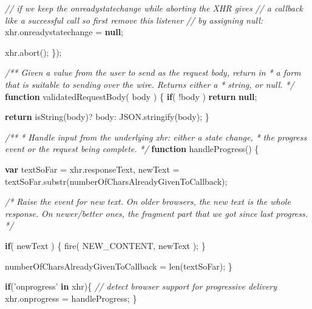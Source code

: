\documentclass[]{article}
\newenvironment{Shaded}{}{}
\newcommand{\KeywordTok}[1]{\textcolor[rgb]{0.00,0.44,0.13}{\textbf{{#1}}}}
\newcommand{\StringTok}[1]{\textcolor[rgb]{0.25,0.44,0.63}{{#1}}}
\newcommand{\CommentTok}[1]{\textcolor[rgb]{0.38,0.63,0.69}{\textit{{#1}}}}
\newcommand{\OtherTok}[1]{\textcolor[rgb]{0.00,0.44,0.13}{{#1}}}
\newcommand{\FunctionTok}[1]{\textcolor[rgb]{0.02,0.16,0.49}{{#1}}}
\newcommand{\NormalTok}[1]{{#1}}
\begin{document}
\begin{Shaded}
\begin{Highlighting}[]
      \CommentTok{// if we keep the onreadystatechange while aborting the XHR gives }
      \CommentTok{// a callback like a successful call so first remove this listener}
      \CommentTok{// by assigning null:}
      \OtherTok{xhr}\NormalTok{.}\FunctionTok{onreadystatechange} \NormalTok{= }\KeywordTok{null}\NormalTok{;}
            
      \OtherTok{xhr}\NormalTok{.}\FunctionTok{abort}\NormalTok{();}
   \NormalTok{\});}

   \CommentTok{/** Given a value from the user to send as the request body, return in}
\CommentTok{    *  a form that is suitable to sending over the wire. Returns either a }
\CommentTok{    *  string, or null.        }
\CommentTok{    */}
   \KeywordTok{function} \FunctionTok{validatedRequestBody}\NormalTok{( body ) \{}
      \KeywordTok{if}\NormalTok{( !body )}
         \KeywordTok{return} \KeywordTok{null}\NormalTok{;}
   
      \KeywordTok{return} \FunctionTok{isString}\NormalTok{(body)? body: }\OtherTok{JSON}\NormalTok{.}\FunctionTok{stringify}\NormalTok{(body);}
   \NormalTok{\}      }

   \CommentTok{/** }
\CommentTok{    * Handle input from the underlying xhr: either a state change,}
\CommentTok{    * the progress event or the request being complete.}
\CommentTok{    */}
   \KeywordTok{function} \FunctionTok{handleProgress}\NormalTok{() \{}
                        
      \KeywordTok{var} \NormalTok{textSoFar = }\OtherTok{xhr}\NormalTok{.}\FunctionTok{responseText}\NormalTok{,}
          \NormalTok{newText = }\OtherTok{textSoFar}\NormalTok{.}\FunctionTok{substr}\NormalTok{(numberOfCharsAlreadyGivenToCallback);}
      
      
      \CommentTok{/* Raise the event for new text.}
\CommentTok{      }
\CommentTok{         On older browsers, the new text is the whole response. }
\CommentTok{         On newer/better ones, the fragment part that we got since }
\CommentTok{         last progress. */}
         
      \KeywordTok{if}\NormalTok{( newText ) \{}
         \FunctionTok{fire}\NormalTok{( NEW_CONTENT, newText );}
      \NormalTok{\} }

      \NormalTok{numberOfCharsAlreadyGivenToCallback = }\FunctionTok{len}\NormalTok{(textSoFar);}
   \NormalTok{\}}
   
   
   \KeywordTok{if}\NormalTok{(}\StringTok{'onprogress'} \KeywordTok{in} \NormalTok{xhr)\{  }\CommentTok{// detect browser support for progressive delivery}
      \OtherTok{xhr}\NormalTok{.}\FunctionTok{onprogress} \NormalTok{= handleProgress;}
   \NormalTok{\}}
   

\end{Highlighting}
\end{Shaded}
\end{document}
